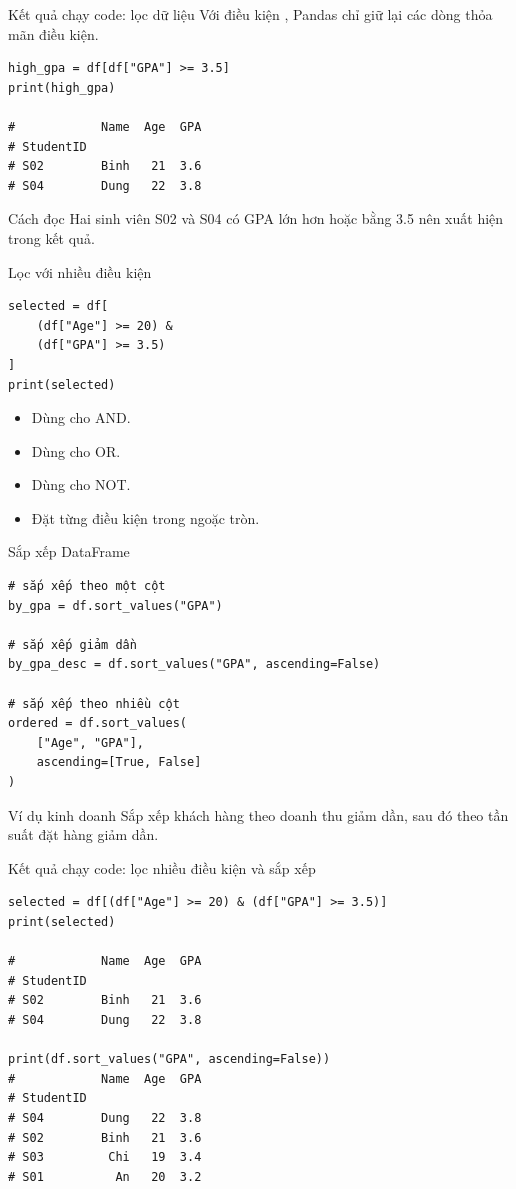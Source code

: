 \documentclass[aspectratio=169,11pt]{beamer}
\newcommand{\cmd}[1]{\texttt{\detokenize{#1}}}
\begin{document}
\begin{frame}[fragile]{Kết quả chạy code: lọc dữ liệu}
\small
Với điều kiện \cmd{GPA >= 3.5}, Pandas chỉ giữ lại các dòng thỏa mãn điều kiện.
\begin{lstlisting}[style=py]
high_gpa = df[df["GPA"] >= 3.5]
print(high_gpa)

#            Name  Age  GPA
# StudentID                
# S02        Binh   21  3.6
# S04        Dung   22  3.8
\end{lstlisting}
\begin{block}{Cách đọc}
Hai sinh viên S02 và S04 có GPA lớn hơn hoặc bằng 3.5 nên xuất hiện trong kết quả.
\end{block}
\end{frame}


\begin{frame}[fragile]{Lọc với nhiều điều kiện}
\small
\begin{lstlisting}[style=py]
selected = df[
    (df["Age"] >= 20) &
    (df["GPA"] >= 3.5)
]
print(selected)
\end{lstlisting}
\begin{itemize}
  \item Dùng \cmd{&} cho AND.
  \item Dùng \cmd{|} cho OR.
  \item Dùng \cmd{~} cho NOT.
  \item Đặt từng điều kiện trong ngoặc tròn.
\end{itemize}
\end{frame}

\begin{frame}[fragile]{Sắp xếp DataFrame}
\small
\begin{lstlisting}[style=py]
# sắp xếp theo một cột
by_gpa = df.sort_values("GPA")

# sắp xếp giảm dần
by_gpa_desc = df.sort_values("GPA", ascending=False)

# sắp xếp theo nhiều cột
ordered = df.sort_values(
    ["Age", "GPA"],
    ascending=[True, False]
)
\end{lstlisting}
\begin{block}{Ví dụ kinh doanh}
Sắp xếp khách hàng theo doanh thu giảm dần, sau đó theo tần suất đặt hàng giảm dần.
\end{block}
\end{frame}

\begin{frame}[fragile]{Kết quả chạy code: lọc nhiều điều kiện và sắp xếp}
\small
\begin{lstlisting}[style=py]
selected = df[(df["Age"] >= 20) & (df["GPA"] >= 3.5)]
print(selected)

#            Name  Age  GPA
# StudentID                
# S02        Binh   21  3.6
# S04        Dung   22  3.8

print(df.sort_values("GPA", ascending=False))
#            Name  Age  GPA
# StudentID                
# S04        Dung   22  3.8
# S02        Binh   21  3.6
# S03         Chi   19  3.4
# S01          An   20  3.2
\end{lstlisting}
\end{frame}
\end{document}
